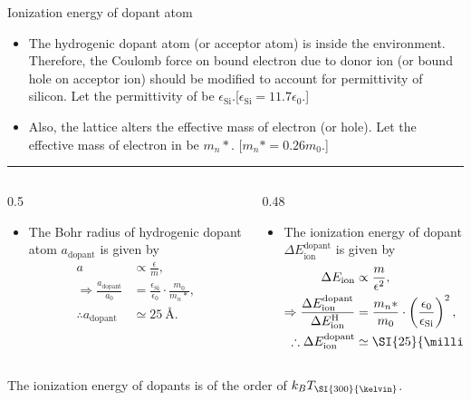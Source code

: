 %
\begin{frame}{Ionization energy of dopant atom}
\begin{small}
		\begin{itemize}
		\item The hydrogenic dopant atom (or acceptor atom) is inside the  environment. Therefore, the Coulomb force on bound electron due to donor ion (or bound hole on acceptor ion) should be modified to account for permittivity of silicon. Let the permittivity of  be \(\epsilon_\text{Si}\).\hfill [\(\epsilon_\text{Si} = 11.7 \epsilon_0 \).]
		\item Also, the  lattice alters the effective mass of electron (or hole). Let the effective mass of electron in  be \(m_n*\). \hfill [\(m_n* = 0.26 m_0\).]
	\end{itemize}
\end{small}
	\hrule
	\vspace{-0.5em}
	\begin{columns}
		\begin{column}[t]{0.5\textwidth}
\begin{small}
				\begin{itemize}
				\item The Bohr radius of hydrogenic dopant atom \(a_\text{dopant}\) is given by
				\begin{align*}
					a &\propto \frac{\epsilon}{m} , \\
					\Rightarrow \frac{a_\text{dopant}}{a_0} &= \frac{\epsilon_\text{Si}}{\epsilon_0} \cdot \frac{m_0}{m_n*}, \\
					\therefore a_\text{dopant} &\simeq \SI{25}{\angstrom}.
				\end{align*}
			\end{itemize}
\end{small}
		\end{column}
		\begin{column}[t]{0.48\textwidth}
			\begin{itemize}
				\item The ionization energy of dopant \(\Delta E_\text{ion}^\text{dopant}\) is given by
				\vspace{-1em}
				\begin{align*}
					\Delta E_\text{ion} &\propto \frac{m}{\epsilon^2},	\\
					\Rightarrow \frac{\Delta E_\text{ion}^\text{dopant}}{\Delta E_\text{ion}^\text{H}} &= \frac{m_n*}{m_0}\cdot \left(\frac{\epsilon_0}{\epsilon_\text{Si}}\right)^2, \\
					\therefore \Delta E_\text{ion}^\text{dopant} &\simeq \SI{25}{\milli\electron\volt}. 
				\end{align*}
			\end{itemize}
		\end{column}
	\end{columns}
	\begin{keyinsight}
		The ionization energy of dopants is of the order of \(k_B T_\text{\SI{300}{\kelvin}}\).
	\end{keyinsight}
\end{frame}
